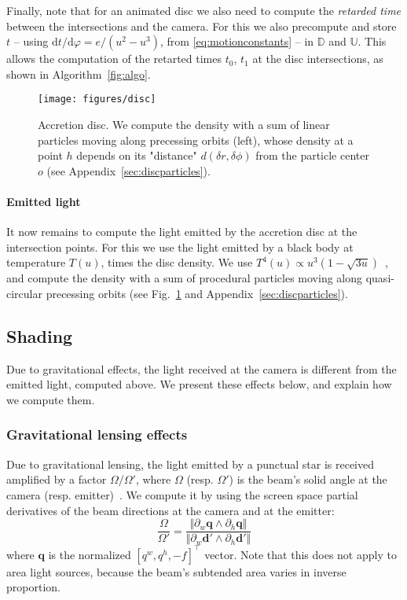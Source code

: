 \documentclass{document}
\newcommand{\diff}{\mathrm d}
\begin{document}
Finally, note that for an animated disc we also need to compute the {\em 
retarded time} between the intersections and the camera. For this we also 
precompute and store $t$ -- using $\diff t / \diff\varphi = e / (u^2 - u^3)$, 
from \eqref{eq:motionconstants} -- in $\mathbb{D}$ and $\mathbb{U}$. This 
allows the computation of the retarted times $t_0$, $t_1$ at the disc 
intersections, as shown in Algorithm~\ref{fig:algo}.

\begin{figure}[t]
	\centering
	\texttt{[image: figures/disc]}
	\caption{\label{fig:disc}Accretion disc. We compute the density with a 
	sum of linear particles moving along precessing orbits (left), whose density 
	at a point $h$ depends on its "distance" $d(\delta r, \delta\phi)$ from the 
	particle center $o$ (see Appendix~\ref{sec:discparticles}).}
\end{figure}

\paragraph*{Emitted light} It now remains to compute the light emitted by the 
accretion disc at the intersection points. For this we use the light emitted by 
a black body at temperature $T(u)$, times the disc density. We use $T^4(u) 
\propto u^3 (1 - \sqrt{3u})$~\cite{Lasota2016}, and compute the density with a 
sum of procedural particles moving along quasi-circular precessing orbits (see 
Fig.~\ref{fig:disc} and Appendix~\ref{sec:discparticles}).

\subsection{Shading}

Due to gravitational effects, the light received at the camera is different 
from the emitted light, computed above. We present these effects below, and 
explain how we compute them.

\subsubsection{Gravitational lensing effects}

Due to gravitational lensing, the light emitted by a punctual star is received 
amplified by a factor $\Omega / \Omega'$, where $\Omega$ (resp. $\Omega'$) is 
the beam's solid angle at the camera (resp. emitter)~\cite{Virbhadra99}. We 
compute it by using the screen space partial derivatives of the beam directions 
at the camera and at the emitter:
\begin{equation}
\frac{\Omega}{\Omega'} = 
    \frac{\Vert \partial_w \mathbf{q} \wedge \partial_h \mathbf{q} \Vert}
         {\Vert \partial_w \mathbf{d}' \wedge \partial_h \mathbf{d}' \Vert}
\end{equation}
where $\mathbf{q}$ is the normalized $[q^w, q^h, -f]^\top$ vector. Note that 
this does not apply to area light sources, because the beam's subtended area 
varies in inverse proportion.
\end{document}

